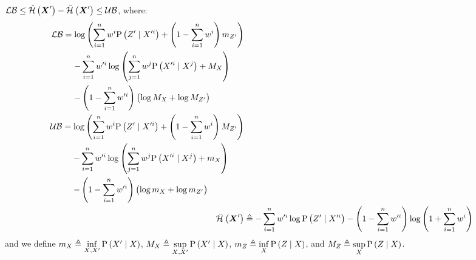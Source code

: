 \begin{propositionE}
	\label{thm:boers_bounds_simple}
	$\operatorname*{\mathcal{LB}}\leq\hat{\mathcal{H}}\left({\boldsymbol X_{}^\prime}\right)-\bar{\mathcal{H}}_{}\left({\boldsymbol X_{}^\prime}\right)\leq\operatorname*{\mathcal{UB}}$, where:
	\begin{subequations}
		\begin{align}
			\begin{split}
				\lowerbound & =\log\left(\sum\limits_{i=1}^n\weight{}{i}\probcond{\observations{}^\prime}{\states{}^{\prime i}}+\left(1-\sum\limits_{i=1}^n\weight{}{i}\right)m_{\observations{}^\prime}\right) \\
				&\phantomeq-\sum_{i=1}^n\weight{}{\prime i}\log\left(\sum_{j=1}^n\weight{}{j}\probcond{\states{}^{\prime i}}{\states{}^j}+M_{\states{}}\right)\\
				& \phantomeq-\left(1-\sum_{i=1}^n\weight{}{\prime i}\right)\left(\log M_{\states{}}+\log M_{\observations{}^\prime}\right)
			\end{split}\\
			\begin{split}
				\upperbound & =\log\left(\sum\limits_{i=1}^n\weight{}{i}\probcond{\observations{}^\prime}{\states{}^{\prime i}}+\left(1-\sum\limits_{i=1}^n\weight{}{i}\right)M_{\observations{}^\prime}\right) \\
				&\phantomeq-\sum_{i=1}^n\weight{}{\prime i}\log\left(\sum_{j=1}^n\weight{}{j}\probcond{\states{}^{\prime i}}{\states{}^j}+m_{\states{}}\right)\\
				& \phantomeq-\left(1-\sum_{i=1}^n\weight{}{\prime i}\right)\left(\log m_{\states{}}+\log m_{\observations{}^\prime}\right)
			\end{split}\\
			\simplentropy{\statesRV{}^\prime}{} & \triangleq-\sum_{i=1}^n\weight{}{\prime i}\log\probcond{\observations{}^\prime}{\states{}^{\prime i}}-\left(1-\sum\limits_{i=1}^n\weight{}{\prime i}\right)\log\left(1+\sum\limits_{i=1}^n\weight{}{i}\right)
		\end{align}
	\end{subequations}
	and we define $m_{X_{}}\triangleq\inf\limits_{X_{},X_{}^\prime}\mathrm{P}\left({X_{}^\prime}\mid{\ensuremath{X_{}}}\right)$, $M_{X_{}}\triangleq\sup\limits_{X_{},X_{}^\prime}\mathrm{P}\left({X_{}^\prime}\mid{\ensuremath{X_{}}}\right)$, $m_{Z_{}}\triangleq\inf\limits_{X_{}}\mathrm{P}\left({Z_{}}\mid{\ensuremath{X_{}}}\right)$, and $M_{Z_{}}\triangleq\sup\limits_{X_{}}\mathrm{P}\left({Z_{}}\mid{\ensuremath{X_{}}}\right)$.
\end{propositionE}

